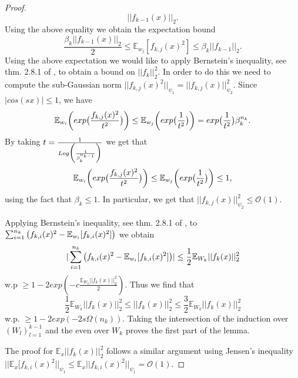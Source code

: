 \documentclass{article}
\theoremstyle{plain}
\theoremstyle{definition}
\theoremstyle{remark}
\begin{document}
\begin{proof}
\begin{equation*}
	\vert\vert f_{k-1}(x)\vert\vert_2.
\end{equation*}
Using the above equality we obtain the expectation bound
\begin{equation}
	\frac{\beta_k\vert\vert f_{k-1}(x)\vert\vert_2}{2} \leq 
	\mathbb{E}_{w_j}[f_{k,j}(x)^2] \leq \beta_k\vert\vert f_{k-1}\vert\vert_2.
\end{equation}
Using the above expectation we would like to apply Bernstein's inequality, see thm. 2.8.1 of \cite{vershynin2018high}, to obtain a bound on $\vert\vert f_k\vert\vert_2^2$. In order to do this we need to compute the sub-Gaussian norm 
$\vert\vert f_{k,j}(x)^2\vert\vert_{\psi_1} = 
\vert\vert f_{k,j}(x)\vert\vert_{\psi_2}^2$. Since $\vert cos(sx)\vert \leq 1$, 
we have
\begin{equation}
\mathbb{E}_{w_i}\bigg{(} 
exp\big{(}
\frac{f_{k,j}(x)^2}{t^2}
\big{)}
\bigg{)} \leq 
\mathbb{E}_{w_j}\bigg{(} 
exp\big{(}\frac{1}{t^2} \big{)}
\bigg{)} = exp\big{(}\frac{1}{t^2} \big{)}\beta_k^{n_k}.
\end{equation}
By taking $t = \frac{1}{Log\bigg{(}\frac{1}{\beta_k^{n_{k-1}}} \bigg{)}}$ we get
that 
\begin{equation*}
	\mathbb{E}_{w_i}\bigg{(} 
exp\big{(}
\frac{f_{k,j}(x)^2}{t^2}
\big{)}
\bigg{)} \leq 
\mathbb{E}_{w_j}\bigg{(} 
exp\big{(}\frac{1}{t^2} \big{)}
\bigg{)} \leq 1,
\end{equation*}
using the fact that $\beta_k \leq 1$. In particular, we get that 
$\vert\vert f_{k,j}(x)\vert\vert_{\psi_2}^2 \leq \mathcal{O}(1)$.

Applying Bernstein's inequality,  see thm. 2.8.1 of \cite{vershynin2018high}, to
$\sum_{i=1}^{n_k}\big{(}f_{k,i}(x)^2 - \mathbb{E}_{w_i}[f_{k,i}(x)^2] \big{)}$
we obtain
\begin{equation}
\vert 
\sum_{i=1}^{n_k}\big{(}f_{k,i}(x)^2 - \mathbb{E}_{w_i}[f_{k,i}(x)^2] \big{)} 
\vert \leq 
\frac{1}{2}\mathbb{E}_{W_k}\vert\vert f_k(x)\vert\vert^2_2
\end{equation}
w.p $\geq 1 - 2exp(-c\frac{\mathbb{E}_{W_k}\vert\vert f_k(x)\vert\vert^2_2}
{2})$. Thus we find that
\begin{equation}
\frac{1}{2}\mathbb{E}_{W_k}\vert\vert f_k(x)\vert\vert^2_2 \leq 
\vert\vert f_k(x)\vert\vert^2_2 \leq \frac{3}{2}\mathbb{E}_{W_k}
\vert\vert f_k(x)\vert\vert_2^2
\end{equation}
w.p. $\geq 1 - 2exp(-2s\Omega(n_k))$. Taking the intersection of the induction over $(W_l)_{l=1}^{k-1}$ and the even over $W_k$ proves the first part of the lemma.

The proof for $\mathbb{E}_x\vert\vert f_k(x)\vert\vert_2^2$ follows a similar argument using Jensen's inequality
$\vert\vert\mathbb{E}_x[f_{k,i}(x)^2\vert\vert_{\psi_1} \leq 
\mathbb{E}_x\vert\vert f_{k,i}(x)^2\vert\vert_{\psi_1} = \mathcal{O}(1)$.
\end{proof}
\end{document}
